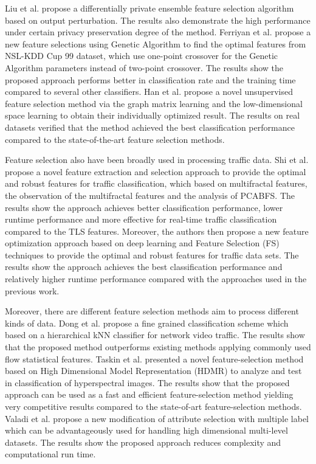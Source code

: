 \documentclass[journal]{IEEEtran}
\begin{document}
Liu et al. \cite{Liu2018} propose a differentially private ensemble feature selection algorithm based on output perturbation. The results also demonstrate the high performance under certain privacy preservation degree of the method. Ferriyan et al. \cite{Ferriyan2017} propose a new feature selections using Genetic Algorithm to find the optimal features from NSL-KDD Cup 99 dataset, which use one-point crossover for the Genetic Algorithm parameters instead of two-point crossover. The results show the proposed approach performs better in classification rate and the training time compared to several other classifiers. Han et al. \cite{Han2020} propose a novel unsupervised feature selection method via the graph matrix learning and the low-dimensional space learning to obtain their individually optimized result. The results on real datasets verified that the method achieved the best classification performance compared to the state-of-the-art feature selection methods.

Feature selection also have been broadly used in processing traffic data. Shi et al. \cite{Shi2017} propose a novel feature extraction and selection approach to provide the optimal and robust features for traffic classification, which based on multifractal features, the observation of the multifractal features and the analysis of PCABFS. The results show the approach achieves better classification performance, lower runtime performance and more effective for real-time traffic classification compared to the TLS features. Moreover, the authors then propose a new feature optimization approach based on deep learning and Feature Selection (FS) techniques\cite{Shi2018} to provide the optimal and robust features for traffic data sets. The results show the approach achieves the best classification performance and relatively higher runtime performance compared with the approaches used in the previous work.

Moreover, there are different feature selection methods aim to process different kinds of data. Dong et al.\cite{Dong2017} propose a fine grained classification scheme which based on a hierarchical kNN classifier for network video traffic. The results show that the proposed method outperforms existing methods applying commonly used flow statistical features. Taskin et al. \cite{Taskin2017} presented a novel feature-selection method based on High Dimensional Model Representation (HDMR) to analyze and test in classification of hyperspectral images. The results show that the proposed approach can be used as a fast and efficient feature-selection method yielding very competitive results compared to the state-of-art feature-selection methods. Valadi et al.\cite{Valadi2019} propose a new modification of attribute selection with multiple label which can be advantageously used for handling high dimensional multi-level datasets. The results show the proposed approach reduces complexity and computational run time.
\end{document}
